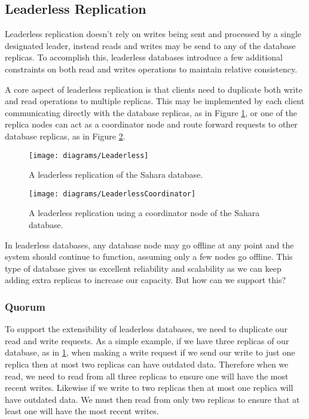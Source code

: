 \subsection{Leaderless Replication}

Leaderless replication doesn't rely on writes being sent and processed by a single designated leader, instead reads and writes may be send to any of the database replicas.
To accomplish this, leaderless databases introduce a few additional constraints on both read and writes operations to maintain relative consistency.

A core aspect of leaderless replication is that clients need to duplicate both write and read operations to multiple replicas.
This may be implemented by each client communicating directly with the database replicas,
as in Figure \ref{fig:sahara-leaderless},
or one of the replica nodes can act as a coordinator node and route forward requests to other database replicas,
as in Figure \ref{fig:sahara-leaderless-coordinator}.

\begin{figure}[ht]
    \begin{center}
    \texttt{[image: diagrams/Leaderless]}
    \end{center}
    \caption{A leaderless replication of the Sahara database.}
    \label{fig:sahara-leaderless}
\end{figure}

\begin{figure}[ht]
    \begin{center}
    \texttt{[image: diagrams/LeaderlessCoordinator]}
    \end{center}
    \caption{A leaderless replication using a coordinator node of the Sahara database.}
    \label{fig:sahara-leaderless-coordinator}
\end{figure}

In leaderless databases,
any database node may go offline at any point and the system should continue to function, assuming only a few nodes go offline.
This type of database gives us excellent reliability and scalability as we can keep adding extra replicas to increase our capacity.
But how can we support this?

\subsubsection*{Quorum}

To support the extensibility of leaderless databases,
we need to duplicate our read and write requests.
As a simple example,
if we have three replicas of our database,
as in \ref{fig:sahara-leaderless},
when making a write request if we send our write to just one replica then at most two replicas can have outdated data.
Therefore when we read, we need to read from all three replicas to ensure one will have the most recent writes.
Likewise if we write to two replicas then at most one replica will have outdated data.
We must then read from only two replicas to ensure that at least one will have the most recent writes.

